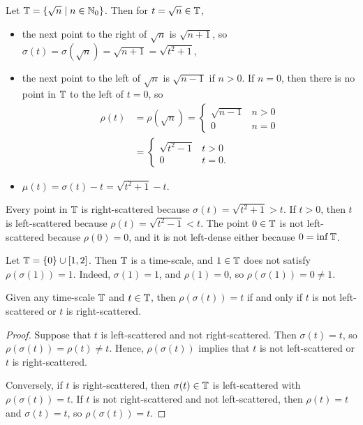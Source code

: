 \documentclass{homework}
\begin{document}
	\maketitle
	
	Let $\mathbb{T} = \{\sqrt{n} \mid n \in \mathbb{N}_0\}$. Then for $t = \sqrt{n} \in \mathbb{T}$,
	\begin{itemize}
		\item the next point to the right of $\sqrt{n}$ is $\sqrt{n+1}$, so $\sigma(t) = \sigma(\sqrt{n}) = \sqrt{n+1} = \sqrt{t^2 + 1}$,
		\item the next point to the left of $\sqrt{n}$ is $\sqrt{n-1}$ if $n > 0$. If $n = 0$, then there is no point in $\mathbb{T}$ to the left of $t=0$, so
		\begin{align*}
			\rho(t) &= \rho(\sqrt{n}) = \begin{cases}
				\sqrt{n-1} & n > 0 \\
				0 & n = 0
			\end{cases}\\
			&= \begin{cases}
				\sqrt{t^2-1} & t > 0 \\
				0 & t = 0.
			\end{cases}
		\end{align*}
		\item $\mu(t) = \sigma(t) - t = \sqrt{t^2 + 1} - t$.
	\end{itemize}
	Every point in $\mathbb{T}$ is right-scattered because $\sigma(t) = \sqrt{t^2 + 1} > t$. If $t > 0$, then $t$ is left-scattered because $\rho(t) = \sqrt{t^2-1} < t$. The point $0 \in \mathbb{T}$ is not left-scattered because $\rho(0) =0$, and it is not left-dense either because $0 = \inf \mathbb{T}$.
	
	Let $\mathbb{T} = \{0\} \cup [1,2]$. Then $\mathbb{T}$ is a time-scale, and $1 \in \mathbb{T}$ does not satisfy $\rho(\sigma(1)) = 1$. Indeed, $\sigma(1) = 1$, and $\rho(1) = 0$, so $\rho(\sigma(1)) = 0 \ne 1$.
	
	Given any time-scale $\mathbb{T}$ and $t \in \mathbb{T}$, then $\rho(\sigma(t)) = t$ if and only if $t$ is not left-scattered or $t$ is right-scattered.
	
	\begin{proof}
		Suppose that $t$ is left-scattered and not right-scattered. Then $\sigma(t) = t$, so $\rho(\sigma(t)) = \rho(t) \ne t$. Hence, $\rho(\sigma(t))$ implies that $t$ is not left-scattered or $t$ is right-scattered.
		
		Conversely, if $t$ is right-scattered, then $\sigma(t) \in \mathbb{T}$ is left-scattered with $\rho(\sigma(t)) = t$. If $t$ is not right-scattered and not left-scattered, then $\rho(t) = t$ and $\sigma(t) = t$, so $\rho(\sigma(t)) = t$.
	\end{proof}
	
\end{document}
